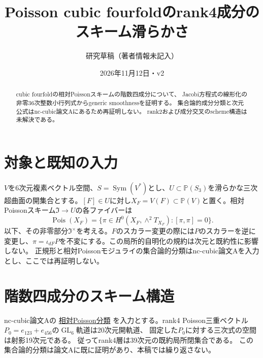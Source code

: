 \documentclass[11pt,a4paper]{ltjsarticle}
\title{Poisson cubic fourfoldのrank4成分のスキーム滑らかさ}\author{研究草稿（著者情報未記入）}
\date{2026年11月12日・v2}
\newcommand{\PP}{\mathbb P}
\newcommand{\Pois}{\operatorname{Pois}}
\newcommand{\Sym}{\operatorname{Sym}}
\newcommand{\GL}{\operatorname{GL}}
\begin{document}
\maketitle
\begin{abstract}
cubic fourfoldの相対Poissonスキームの階数四成分について、
Jacobi方程式の線形化の非零36次整数小行列式からgeneric smoothnessを証明する。
集合論的成分分類と次元公式はnc-cubic論文Aにあるため再証明しない。
rank2および成分交叉のscheme構造は未解決である。
\end{abstract}
\section{対象と既知の入力}\label{sec:input}
$V$を6次元複素ベクトル空間、$S=\Sym(V^*)$とし、$U\subset\PP(S_3)$を滑らかな三次超曲面の開集合とする。$[F]\in U$に対し$X_F=V(F)\subset\PP(V)$と置く。相対Poissonスキーム$\mathfrak I\to U$の各ファイバーは
\[
 \Pois(X_F)=\{\pi\in H^0(X_F,\wedge^2T_{X_F}):[\pi,\pi]=0\}.
\]
以下、その非零部分$\mathfrak I^\times$を考える。$F$のスカラー変更の際には$P$のスカラーを逆に変更し、$\pi=\iota_{dF}P$を不変にする。この局所的自明化の規約は次元と既約性に影響しない。
正規形と相対Poissonモジュライの集合論的分類はnc-cubic論文Aを入力とし、ここでは再証明しない。\n\section{階数四成分のスキーム構造}
nc-cubic論文Aの
\href{https://github.com/uedakazushi/nc-cubic/blob/main/papers/support/papers/sections/fermat_relative_poisson_components.tex}{相対Poisson分類}
を入力とする。rank4 Poisson三重ベクトル$P_0=e_{123}+e_{456}$の$\GL_6$軌道は20次元開軌道、
固定した$P_0$に対する三次式の空間は射影19次元である。
従ってrank4層は39次元の既約局所閉集合である。
この集合論的分類は論文Aに既に証明があり、本稿では繰り返さない。
\end{document}
